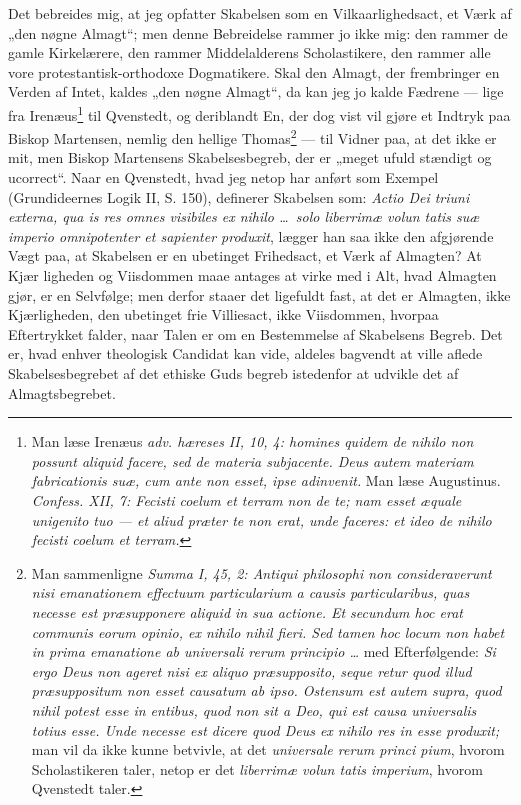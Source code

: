 \documentclass[12pt]{book}
\newcommand{\opage}[1]{\marginnote{\footnotesize\textit{[#1]}}}
\begin{document}
Det bebreides mig, at jeg opfatter Skabelsen som en
Vilkaarlighedsact, et Værk af „den nøgne Almagt“; men
denne Bebreidelse rammer jo ikke mig: den rammer de gamle
Kirkelærere, den rammer Middelalderens Scholastikere, den
rammer alle vore protestantisk-orthodoxe Dogmatikere. Skal
\opage{102}\setcounter{footnote}{0}%
den Almagt, der frembringer en Verden af Intet, kaldes
„den nøgne Almagt“, da kan jeg jo kalde Fædrene --- lige\-%
fra Irenæus\footnote{Man læse Irenæus \textit{adv. hæreses II, 10, 4: homines quidem de
nihilo non possunt aliquid facere, sed de materia subjacente.
Deus autem materiam fabricationis suæ, cum ante non esset,
ipse adinvenit.} Man læse Augustinus. \textit{Confess. XII, 7: Fecisti
coelum et terram non de te; nam esset æquale unigenito tuo
--- et aliud præter te non erat, unde faceres: et ideo de nihilo
fecisti coelum et terram.}} til Qvenstedt, og deriblandt En, der dog vist
vil gjøre et Indtryk paa Biskop Martensen, nemlig den
hellige Thomas\footnote{Man sammenligne \textit{Summa I, 45, 2: Antiqui philosophi non
consideraverunt nisi emanationem effectuum particularium a
causis particularibus, quas necesse est præsupponere aliquid in
sua actione. Et secundum hoc erat communis eorum opinio,
ex nihilo nihil fieri. Sed tamen hoc locum non habet in prima
emanatione ab universali rerum principio \dots} med Efterfølgende:
\textit{Si ergo Deus non ageret nisi ex aliquo præsupposito, seque\-%
retur quod illud præsuppositum non esset causatum ab ipso.
Ostensum est autem supra, quod nihil potest esse in entibus,
quod non sit a Deo, qui est causa universalis totius esse. Unde
necesse est dicere quod Deus ex nihilo res in esse produxit;}
man vil da ikke kunne betvivle, at det \textit{universale rerum princi\-%
pium}, hvorom Scholastikeren taler, netop er det \textit{liberrimæ volun\-%
tatis imperium}, hvorom Qvenstedt taler.} --- til Vidner paa, at det ikke er mit,
men Biskop Martensens Skabelsesbegreb, der er „meget ufuld\-%
stændigt og ucorrect“. Naar en Qvenstedt, hvad jeg netop
har anført som Exempel (Grundideernes Logik II, S. 150),
definerer Skabelsen som: \textit{Actio Dei triuni externa, qua is
res omnes visibiles ex nihilo \dots\ solo liberrimæ volun\-%
tatis suæ imperio omnipotenter et sapienter produxit},
lægger han saa ikke den afgjørende Vægt paa, at Skabelsen
er en ubetinget Frihedsact, et Værk af Almagten? At Kjær\-%
ligheden og Viisdommen maae antages at virke med i Alt,
\opage{103}\setcounter{footnote}{0}%
hvad Almagten gjør, er en Selvfølge; men derfor staaer det
ligefuldt fast, at det er Almagten, ikke Kjærligheden, den
ubetinget frie Villiesact, ikke Viisdommen, hvorpaa Eftertrykket
falder, naar Talen er om en Bestemmelse af Skabelsens Begreb.
Det er, hvad enhver theologisk Candidat kan vide, aldeles
bagvendt at ville aflede Skabelsesbegrebet af det ethiske Guds\-%
begreb istedenfor at udvikle det af Almagtsbegrebet.
\end{document}
